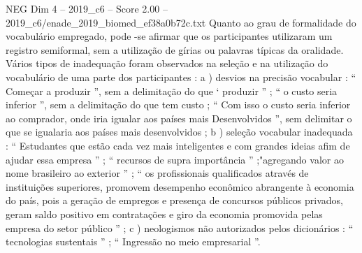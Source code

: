 \begin{textsample}{NEG Dim 4 – 2019\_c6 – Score 2.00 – 2019\_c6/enade\_2019\_biomed\_ef38a0b72c.txt}
Quanto ao grau de formalidade do vocabulário empregado, pode -se afirmar que os participantes utilizaram um registro semiformal, sem a utilização de gírias ou palavras típicas da oralidade.
Vários tipos de inadequação foram observados na seleção e na utilização do vocabulário de uma parte dos participantes : a ) desvios na precisão vocabular : “ Começar a produzir ”, sem a delimitação do que ‘ produzir ” ; “ o custo seria inferior ”, sem a delimitação do que tem custo ; “ Com isso o custo seria inferior ao comprador, onde iria igualar aos países mais Desenvolvidos ”, sem delimitar o que se igualaria aos países mais desenvolvidos ; b ) seleção vocabular inadequada : “ Estudantes que estão cada vez mais inteligentes e com grandes ideias afim de ajudar essa empresa ” ; “ recursos de supra importância ” ;"agregando valor ao nome brasileiro ao exterior ” ; “ os profissionais qualificados através de instituições superiores, promovem desempenho econômico abrangente à economia do país, pois a geração de empregos e presença de concursos públicos privados, geram saldo positivo em contratações e giro da economia promovida pelas empresa do setor público ” ; c ) neologismos não autorizados pelos dicionários : “ tecnologias sustentais ” ; “ Ingressão no meio empresarial ”.

\end{textsample}
